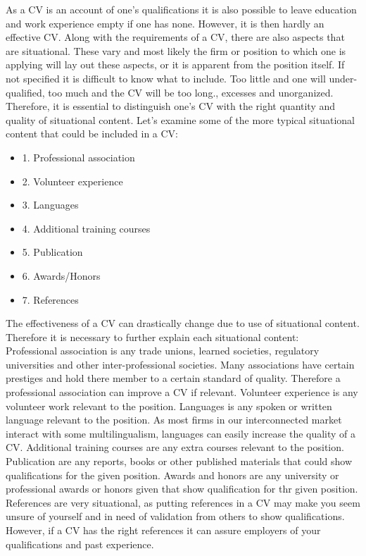 As a CV is an account of one’s qualifications it is also possible to leave education and work experience empty if one has none.
However, it is then hardly an effective CV.\cite{Difference_between_resume_and_curriculum_Vitae}
Along with the requirements of a CV, there are also aspects that are situational.
These vary and most likely the firm or position to which one is applying will lay out these aspects, or it is apparent from the position itself.
If not specified it is difficult to know what to include. Too little and one will under-qualified, too much and the CV will be too long.\cite{Job_Application_for_science}, excesses and unorganized.
Therefore, it is essential to distinguish one’s CV with the right quantity and quality of situational content.
Let's examine some of the more typical situational content that could be included in a CV: \\
\begin{itemize}
   \item 1. Professional association
   \item 2. Volunteer experience
   \item 3. Languages
   \item 4. Additional training courses
   \item 5. Publication
   \item 6. Awards/Honors
   \item 7. References\cite{6_sections} \\
\end{itemize}
The effectiveness of a CV can drastically change due to use of situational content.
Therefore it is necessary to further explain each situational content: \\
Professional association is any trade unions, learned societies, regulatory universities and other inter-professional societies.
Many associations have certain prestiges and hold there member to a certain standard of quality.
Therefore a professional association can improve a CV if relevant.\cite{Professional_associations_and_organizations}\cite{Perks_of_professional_organizations}
Volunteer experience is any volunteer work relevant to the position.
Languages is any spoken or written language relevant to the position.
As most firms in our interconnected market interact with some multilingualism, languages can easily increase the quality of a CV.
Additional training courses are any extra courses relevant to the position. 
Publication are any reports, books or other published materials that could show qualifications for the given position.
Awards and honors are any university or professional awards or honors given that show qualification for thr given position.
References are very situational, as putting references in a CV may make you seem unsure of yourself and in need of validation from others to show qualifications.
However, if a CV has the right references it can assure employers of your qualifications and past experience.\\

